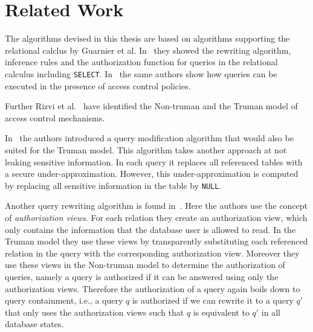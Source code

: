 \section{Related Work}

The algorithms devised in this thesis are based on algorithms supporting the relational calclus by Guarnier et al. In~\cite{guarnieri2016strong} they showed the rewriting algorithm, inference rules and the authorization function for queries in the relational calculus including \texttt{SELECT}.
%
In~\cite{guarnieri2014optimal} the same authors show how queries can be executed in the presence of access control policies.

Further Rizvi et al.~\cite{rizvi2004extending} have identified the Non-truman and the Truman model of access control mechanisms.

In~\cite{wang2007correctness} the authors introduced a query modification algorithm that would also be suited for the Truman model.
%
%
This algorithm takes another approach at not leaking sensitive information.
%
In each query it replaces all referenced tables with a secure under-approximation.
%
However, this under-approximation is computed by replacing all sensitive information in the table by \texttt{NULL}.
%

Another query rewriting algorithm is found in~\cite{rizvi2004extending}. 
%
Here the authors use the concept of \emph{authorization views}.
%
For each relation they create an authorization view, which only contains the information that the database user is allowed to read.
%
In the Truman model they use these views by transparently substituting each referenced relation in the query with the corresponding authorization view.
%
Moreover they use these views in the Non-truman model to determine the authorization of queries, namely a query is authorized if it can be answered using only the authorization views.
%
Therefore the authorization of a query again boils down to query containment, i.e., a query $q$ is authorized if we can rewrite it to a query $q'$ that only uses the authorization views such that $q$ is equivalent to $q'$ in all database states.
